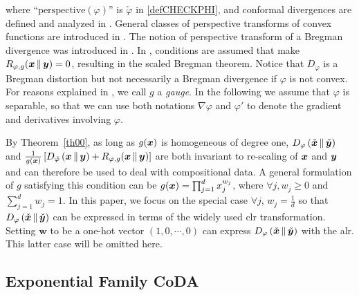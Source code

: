 \documentclass{article}
\begin{document}
where
``$\mathrm{perspective}(\varphi)$'' is $\check{\varphi}$ in \eqref{defCHECKPHI},
and conformal divergences are defined and analyzed in
\cite{nnaOCD}. General classes of perspective transforms of convex
functions are introduced in \cite{mOAI,mOAII}. The notion of
perspective transform of a Bregman divergence was introduced in \cite{nmoAS}.
In \cite[Theorem 1]{nmoAS}, conditions are assumed that make $R_{\varphi, g}(\bm{x}\,\Vert\,\bm{y}) = 0$,
resulting in the scaled Bregman theorem. Notice that
$D_\varphi$ is a Bregman distortion but not necessarily a Bregman divergence
if $\varphi$ is not convex. For reasons explained in \cite{nmoAS},
we call $g$ a \emph{gauge}. In the following we assume that $\varphi$ is
separable, so that we can use both notations $\nabla\varphi$ and
$\varphi'$ to denote the gradient and derivatives involving $\varphi$.

By Theorem~\ref{th00}, as long as $g(\bm{x})$ is homogeneous of degree one,
$D_{\varphi}\left( \check{\bm{x}} \,\Vert\, \check{\bm{y}} \right)$ and
$\frac{1}{g(\bm{x})} \left[D_{\check{\varphi}}\left( \bm{x} \,\Vert\, \bm{y}\right) + R_{\varphi, g}(\bm{x}\,\Vert\,\bm{y})\right]$
are both invariant to re-scaling of $\bm{x}$ and $\bm{y}$ and can therefore be used to deal with compositional data.
A general formulation of $g$ satisfying this condition can be
$g(\bm{x})=\prod_{j=1}^d x_j^{w_j}$, where $\forall{j}, w_j\ge0$ and $\sum_{j=1}^d w_j=1$.
In this paper, we focus on the special case $\forall{j}$, $w_j=\frac{1}{d}$ so that
$D_{\varphi}\left( \check{\bm{x}} \,\Vert\, \check{\bm{y}} \right)$
can be expressed in terms of the widely used clr transformation.
Setting $\bm{w}$ to be a one-hot vector $(1,0,\cdots,0)$ can
express $D_{\varphi}\left( \check{\bm{x}} \,\Vert\, \check{\bm{y}} \right)$
with the alr. This latter case will be omitted here.

\subsection{Exponential Family CoDA}
\end{document}
